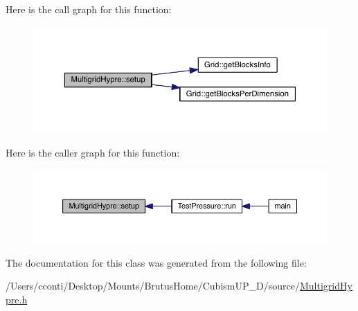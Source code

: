 Here is the call graph for this function\+:\nopagebreak
\begin{figure}[H]
\begin{center}
\leavevmode
\includegraphics[width=350pt]{d7/d01/class_multigrid_hypre_a43a4d038e324f28cb4076bfe73d219b3_cgraph}
\end{center}
\end{figure}




Here is the caller graph for this function\+:\nopagebreak
\begin{figure}[H]
\begin{center}
\leavevmode
\includegraphics[width=350pt]{d7/d01/class_multigrid_hypre_a43a4d038e324f28cb4076bfe73d219b3_icgraph}
\end{center}
\end{figure}




The documentation for this class was generated from the following file\+:\begin{DoxyCompactItemize}
\item 
/\+Users/cconti/\+Desktop/\+Mounts/\+Brutus\+Home/\+Cubism\+U\+P\+\_\+D/source/\hyperlink{_multigrid_hypre_8h}{Multigrid\+Hypre.\+h}\end{DoxyCompactItemize}

